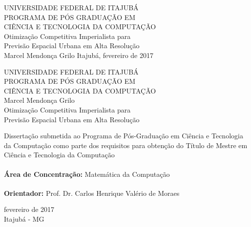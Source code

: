     \begin{center}
        {\normalsize UNIVERSIDADE FEDERAL DE ITAJUBÁ} \\[0.5cm]
        {\normalsize PROGRAMA DE PÓS GRADUAÇÃO EM} \\
        {\normalsize CIÊNCIA E TECNOLOGIA DA COMPUTAÇÃO} \\[7.0cm]
        {\Large Otimização Competitiva Imperialista para \\ Previsão Espacial Urbana em  Alta Resolução} \\[4.0cm]
        {\large Marcel Mendonça Grilo}
        \vfill
        {\normalsize Itajubá, fevereiro de 2017}
    \end{center}
\cleardoublepage
    \begin{center}
        {\normalsize UNIVERSIDADE FEDERAL DE ITAJUBÁ} \\
        {\normalsize PROGRAMA DE PÓS GRADUAÇÃO EM} \\
        {\normalsize CIÊNCIA E TECNOLOGIA DA COMPUTAÇÃO} \\[3.3cm]
        {\large Marcel Mendonça Grilo} \\[3.3cm]
        {\Large Otimização Competitiva Imperialista para \\ Previsão Espacial Urbana em  Alta Resolução} \\[5.0cm]
        \begin{flushright}
        \begin{minipage}{.70\textwidth}
                Dissertação submetida ao Programa de Pós-Graduação em Ciência e Tecnologia 
                da Computação como parte dos requisitos para obtenção do Título de 
                Mestre em Ciência e Tecnologia da Computação \\ \\
                \textbf{Área de Concentração:}  Matemática da Computação \\ \\
                \textbf{Orientador:} Prof. Dr. Carlos Henrique Valério de Moraes \\
        \end{minipage}
        \end{flushright}
        \vfill
        {\normalsize fevereiro de 2017} \\
        {\normalsize Itajubá - MG}
    \end{center}
    \cleardoublepage